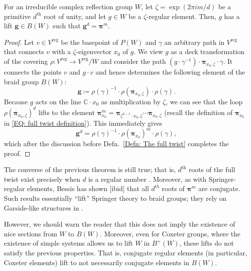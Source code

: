 \documentclass[ALCO, Unicode]{cedram}
\newcommand{\op}[1]{\operatorname{#1}}
\newcommand{\CC}{\mathbb{C}}
\newcommand{\op}[1]{\operatorname{#1}}
\begin{document}
\begin{prop}\label{Prop: regular elements lift to roots of the full twist}
For an irreducible complex reflection group $W$, let $\zeta=\op{exp}(2\pi i m/d)$ be a primitive $d^{\text{th}}$ root of unity, and let $g\in W$ be a $\zeta$-regular element. Then, $g$ has a lift $\bm g\in B(W)$ such that $\bm g^d=\bm \pi ^m$.
\end{prop}
\begin{proof}
Let $v\in V^{\op{reg}}$ be the basepoint of $P(W)$ and $\gamma$ an arbitrary path in $V^{\op{reg}}$ that connects $v$ with a $\zeta$-eigenvector $x_0$ of $g$. We view $g$ as a deck transformation of the covering $\rho: V^{\op{reg}}\rightarrow V^{\op{reg}}/W$ and consider the path $(g\cdot \gamma^{-1})\cdot \bm \pi_{x_0,\zeta}\cdot \gamma$.  It connects the points $v$ and $g\cdot v$ and hence determines the following element of the braid group $B(W)$: $$\bm g\coloneqq \rho(\gamma)^{-1}\cdot \rho(\bm \pi_{x_0,\zeta})\cdot \rho(\gamma).$$
Because $g$ acts on the line $\CC\cdot x_0$ as multiplication by $\zeta$, we can see that the loop $\rho( \bm \pi_{x_0,\zeta})^d$ lifts to the element $\bm \pi_{x_0}^m=\bm \pi_{\zeta^{d-1}\cdot x_0,\zeta}\cdots \bm\pi_{x_0,\zeta}$ (recall the definition of $\bm \pi_{x_0}$ in \eqref{EQ: full twist definition}). This immediately gives 
$$\bm g^d=\rho(\gamma)^{-1}\cdot \rho(\bm \pi_{x_0})^m \cdot \rho(\gamma),$$ which after the discussion before Defn.~\ref{Defn: The full twist} completes the proof.
\end{proof}

\begin{rema}
The converse of the previous theorem is still true; that is, $d^{\text{th}}$ roots of the full twist exist precisely when $d$ is a regular number \cite[Thm.~12.4]{bes-kpi1}. Moreover, as with Springer-regular elements, Bessis has shown [ibid] that all $d^{th}$ roots of $\bm\pi^m$ are conjugate. Such results essentially ``lift'' Springer theory to braid groups; they rely on Garside-like structures in \cite{bessis-garside-arxiv}.

However, we should warn the reader that this does not imply the existence of nice sections from $W$ to $B(W)$. Moreover, even for Coxeter groups, where the existence of simple systems allows us to lift $W$ in $B^+(W)$, these lifts do not satisfy the previous properties. That is, conjugate regular elements (in particular, Coxeter elements) lift to not necessarily conjugate elements in $B(W)$.
\end{rema} 
\end{document}
